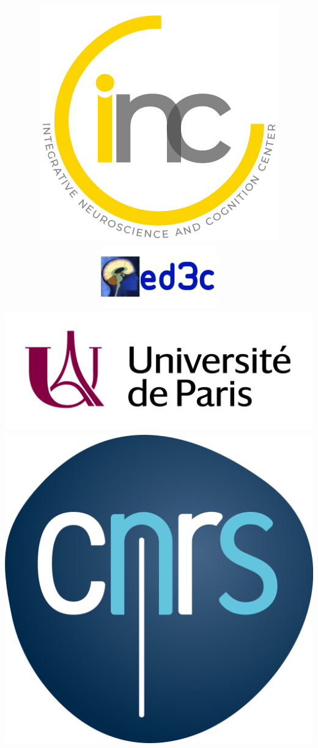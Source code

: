 \documentclass[11pt, pdflatex, compress]{beamer}
\begin{document}
   	\title{\includegraphics[scale=0.10]{logoincc.jpg}  \includegraphics[scale=0.3]{ed3c.png} \includegraphics[scale=0.05]{logouniv.jpg}  \includegraphics[scale=0.03]{logocnrs.png} \\
      
}
\end{document}

